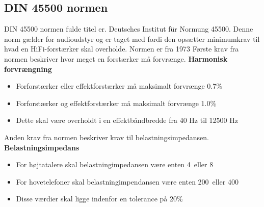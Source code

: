 \subsection*{DIN 45500 normen}
\label{DIN45500}
DIN 45500 normen fulde titel er. Deutsches Institut f\"{u}r Normung 45500. Denne norm gælder for audioudstyr og er taget med fordi den opsætter minimumkrav til hvad en HiFi-forstærker skal overholde. Normen er fra 1973
\newline
\newline
Første krav fra normen beskriver hvor meget en forstærker må forvrænge.
\newline
\newline
\textbf{Harmonisk forvrængning}
\begin{itemize}
\item Forforstærker eller effektforstærker må maksimalt forvrænge 0.7\%
\item Forforstærker og effektforstærker må maksimalt forvrænge 1.0\%
\item Dette skal være overholdt i en effektbåndbredde fra 40 Hz til 12500 Hz
\end{itemize}
Anden krav fra normen beskriver krav til belastningsimpedansen.
\newline 
\newline
\textbf{Belastningsimpedans}
\begin{itemize}
\item For højtatalere skal belastningimpedansen være enten 4\ohm~eller 8\ohm
\item For hovetelefoner skal belastningimpendansen være enten 200\ohm~eller 400\ohm
\item Disse værdier skal ligge indenfor en tolerance på 20\%
\end{itemize}